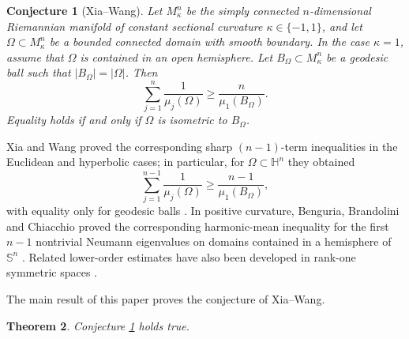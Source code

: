 \documentclass[10pt,a4paper]{amsart}
\newtheorem{theorem}{Theorem}[section]
\newtheorem{conjecture}[theorem]{Conjecture}
\newtheorem{remark}[theorem]{Remark}
\newcommand{\HH}{\mathbb H}
\newcommand{\Sn}{\mathbb S}
\begin{document}
\begin{conjecture}[Xia--Wang]\label{conj:XW-spaceform}
Let $M^n_\kappa$ be the simply connected $n$-dimensional Riemannian manifold of constant sectional curvature $\kappa\in\{-1,1\}$, and let $\Omega\subset M^n_\kappa$ be a bounded connected domain with smooth boundary.  In the case $\kappa=1$, assume that $\Omega$ is contained in an open hemisphere.  Let $B_\Omega\subset M^n_\kappa$ be a geodesic ball such that $|B_\Omega|=|\Omega|$.  Then
\begin{equation}\label{eq:XW-spaceform-conj}
        \sum_{j=1}^n\frac1{\mu_j(\Omega)}
        \ge
        \frac{n}{\mu_1(B_\Omega)}.
\end{equation}
Equality holds if and only if $\Omega$ is isometric to $B_\Omega$.
\end{conjecture}

Xia and Wang proved the corresponding sharp $(n-1)$-term inequalities in the Euclidean and hyperbolic cases; in particular, for $\Omega\subset\HH^n$ they obtained
$$
        \sum_{j=1}^{n-1}\frac1{\mu_j(\Omega)}
        \ge
        \frac{n-1}{\mu_1(B_\Omega)},
$$
with equality only for geodesic balls \cite{XiaWang}.  In positive curvature, Benguria, Brandolini and Chiacchio proved the corresponding harmonic-mean inequality for the first $n-1$ nontrivial Neumann eigenvalues on domains contained in a hemisphere of $\Sn^n$ \cite{BBC}.  Related lower-order estimates have also been developed in rank-one symmetric spaces \cite{MengWang}.

The main result of this paper proves the conjecture of Xia--Wang.


\begin{theorem}\label{thm:main}
Conjecture \ref{conj:XW-spaceform} holds true.  
\end{theorem}


\end{document}
